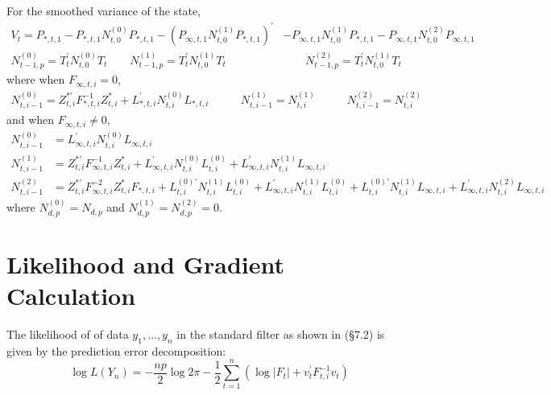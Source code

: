 \documentclass[12pt]{article}
\newcommand{\Cov}[0]{\text{Cov}}
\newcommand{\Var}[0]{\text{Var}}
\newcommand{\flag}[0]{red}
\begin{document}
	For the smoothed variance of the state, 
	\begin{align*}
	V_t = P_{*,t,1} - P_{*,t,1} N_{t,0}^{(0)} P_{*,t,1} - \left(P_{\infty,t,1} N_{t,0}^{(1)} P_{*,t,1} \right)^\prime &- P_{\infty,t,1} N_{t,0}^{(1)} P_{*,t,1} - P_{\infty,t,1} N_{t,0}^{(2)} P_{\infty,t,1} \\
	N_{t-1,p}^{(0)} = T_t^\prime N_{t,0}^{(0)} T_t \qquad
	N_{t-1,p}^{(1)} = T_t^\prime N_{t,0}^{(1)} T_t &\qquad
	N_{t-1,p}^{(2)} = T_t^\prime N_{t,0}^{(1)} T_t 
	\end{align*}
	where when $F_{\infty,t,i} = 0$, 
	\begin{align*}
	N_{t,i-1}^{(0)} = Z_{t,i}^{*\prime} F_{*,t,i}^{-1} Z_{t,i}^* + L_{*,t,i}^\prime N_{t,i}^{(0)} L_{*,t,i} &\qquad
	N_{t,i-1}^{(1)} = N_{t,i}^{(1)} &\qquad
	N_{t,i-1}^{(2)} = N_{t,i}^{(2)} 
	\end{align*}
	and when $F_{\infty,t,i} \neq 0$,
	\begin{align*}
	N_{t,i-1}^{(0)} &= L_{\infty,t,i}^\prime N_{t,i}^{(0)} L_{\infty,t,i}\\
	N_{t,i-1}^{(1)} &= Z_{t,i}^{*\prime} F_{\infty,t,i}^{-1} Z_{t,i}^* + L_{\infty,t,i}^\prime N_{t,i}^{(0)} L_{t,i}^{(0)} + L_{\infty,t,i}^\prime N_{t,i}^{(1)} L_{\infty,t,i}  \\
	N_{t,i-1}^{(2)} &= Z_{t,i}^{*\prime} F_{\infty,t,i}^{-2} Z_{t,i}^* F_{*,t,i} + L_{t,i}^{(0)\prime} N_{t,i}^{(1)} L_{t,i}^{(0)} + L_{\infty,t,i}^\prime N_{t,i}^{(1)} L_{t,i}^{(0)} + L_{t,i}^{(0)\prime} N_{t,i}^{(1)} L_{\infty,t,i} + L_{\infty,t,i}^\prime N_{t,i}^{(2)} L_{\infty,t,i}
	\end{align*}
	where $N_{d,p}^{(0)} = N_{d,p}$ and $N_{d,p}^{(1)} = N_{d,p}^{(2)} = 0$. \\


\newpage
\section{Likelihood and Gradient Calculation}
	The likelihood of of data $y_1, \dots, y_n$ in the standard filter as shown in \cite{dk_book} (\S 7.2) is given by the prediction error decomposition:
	\begin{equation*}
	\log L(Y_n) = -\frac{np}{2} \log 2\pi - \frac{1}{2} \sum_{t=1}^n \left(\log |F_t| + v_t^\prime F_{t,i}^{-1} v_t \right)
	\end{equation*}
	
\end{document}
